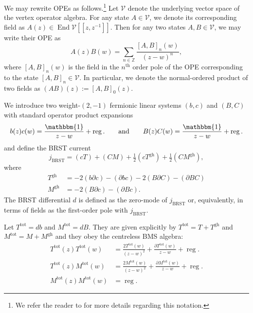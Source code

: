 \documentclass[11pt,reqno,a4paper,final]{amsart}
\theoremstyle{plain}
\theoremstyle{definition}
\newcommand{\reg}{\operatorname{reg}}
\newcommand{\Tgh}{T^{\text{gh}}}
\newcommand{\Mgh}{M^{\text{gh}}}
\newcommand{\Ttot}{T^{\text{tot}}}
\newcommand{\Mtot}{M^{\text{tot}}}
\newcommand{\ZZ}{\mathbb{Z}}
\newcommand{\1}{\mathbb{1}}
\newcommand{\End}{\operatorname{End}}
\numberwithin{equation}{section}
\begin{document}
We may rewrite OPEs as follows.\footnote{We refer the reader to
  \cite[Section 2]{Figueroa-OFarrill:2024wgs} for more details
  regarding this notation.}  Let $\mathcal{V}$ denote the underlying
vector space of the vertex operator algebra.  For any state
$A \in \mathcal{V}$, we denote its corresponding field as
$A(z) \in \End \mathcal{V}[[z,z^{-1}]]$.  Then for any two states
$A,B\in \mathcal{V}$, we may write their OPE as
\begin{equation}
  A(z)B(w) = \sum_{n\in\ZZ} \frac{[A,B]_n(w)}{(z-w)^n},
\end{equation}
where $[A,B]_n(w)$ is the field in the $n^{\text{th}}$ order pole of the
OPE corresponding to the state $[A,B]_n \in \mathcal{V}$. In
particular, we denote the normal-ordered product of two fields as
$(AB)(z):= [A,B]_0(z)$.

We introduce two weight-$(2,-1)$ fermionic linear systems $(b,c)$ and
$(B,C)$ with standard operator product expansions
\begin{equation}
  b(z) c(w) = \frac{\mathbbm{1}}{z-w} + \reg. \qquad\text{and}\qquad
  B(z) C(w) = \frac{\mathbbm{1}}{z-w} + \reg.
\end{equation}
and define the BRST current
\begin{equation} \label{eq:BRST current}
  j_{\text{BRST}} = (c T) + (C M) + \tfrac12 (c \Tgh) + \tfrac12 (C \Mgh),
\end{equation}
where~\cite{Figueroa-OFarrill:2024wgs}
\begin{equation}
  \begin{split}
    \Tgh &= -2(b\partial c) - (\partial b c) - 2 (B\partial C) - (\partial B C)\\
    \Mgh &= -2 (B\partial c) - (\partial B c).
  \end{split}
\end{equation}
The BRST differential $d$ is defined as the zero-mode of
$j_{\text{BRST}}$ or, equivalently, in terms of fields as the
first-order pole with $j_{\text{BRST}}$.

Let $\Ttot = db$ and $\Mtot = dB$.  They are given explicitly by
$\Ttot = T + \Tgh$ and $\Mtot = M + \Mgh$ and they obey the centreless
BMS algebra:
\begin{equation}
  \begin{split}
    \Ttot(z)\Ttot(w) &= \frac{2\Ttot(w)}{(z-w)^2} + \frac{\partial \Ttot(w)}{z-w} + \reg.\\
    \Ttot(z)\Mtot(w) &= \frac{2\Mtot(w)}{(z-w)^2} + \frac{\partial \Mtot(w)}{z-w} + \reg.\\
    \Mtot(z)\Mtot(w) &= \reg.
  \end{split}
\end{equation}
\end{document}
